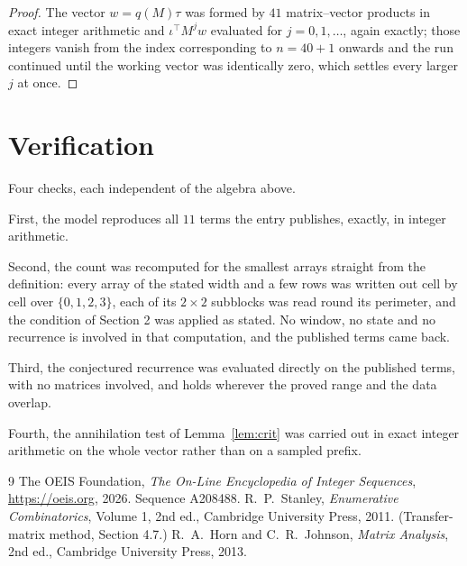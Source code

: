 \documentclass[11pt,a4paper]{article}
\theoremstyle{plain}
\theoremstyle{definition}
\begin{document}
\begin{proof}
The vector $w=q(M)\tau$ was formed by $41$ matrix--vector products in exact integer
arithmetic and $\iota^{\!\top}M^{j}w$ evaluated for $j=0,1,\dots$, again exactly; those
integers vanish from the index corresponding to $n=40+1$ onwards and the run continued
until the working vector was identically zero, which settles every larger $j$ at once.
\end{proof}

\section{Verification}

Four checks, each independent of the algebra above.

First, the model reproduces all $11$ terms the entry publishes, exactly, in integer
arithmetic.

Second, the count was recomputed for the smallest arrays straight from the definition: every
array of the stated width and a few rows was written out cell by cell over $\{0,1,2,3\}$, each of
its $2\times2$ subblocks was read round its perimeter, and the condition of Section 2 was
applied as stated. No window, no state and no recurrence is involved in that computation, and
the published terms came back.

Third, the conjectured recurrence was evaluated directly on the published terms, with no
matrices involved, and holds wherever the proved range and the data overlap.

Fourth, the annihilation test of Lemma~\ref{lem:crit} was carried out in exact integer
arithmetic on the whole vector rather than on a sampled prefix.

\begin{thebibliography}{9}
 The OEIS Foundation, \emph{The On-Line Encyclopedia of Integer
Sequences}, \url{https://oeis.org}, 2026. Sequence A208488.
 R.~P.~Stanley, \emph{Enumerative Combinatorics}, Volume 1, 2nd ed.,
Cambridge University Press, 2011. (Transfer-matrix method, Section 4.7.)
 R.~A.~Horn and C.~R.~Johnson, \emph{Matrix Analysis}, 2nd ed., Cambridge
University Press, 2013.
\end{thebibliography}
\end{document}
